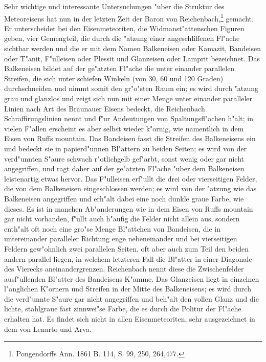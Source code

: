 \documentclass[a4paper, 11pt, oneside, german]{article}
\begin{document}
Sehr wichtige und interessante Untersuchungen "uber die Struktur des Meteoreisens hat nun in der letzten Zeit der Baron von Reichenbach,\footnote{Pongendorffs Ann. 1861 B. 114, S. 99, 250, 264,477.} gemacht. Er unterscheidet bei den Eisenmeteoriten, die Widmanst"attenschen Figuren geben, vier Gemengteil, die durch die "atzung einer angeschliffenen Fl"ache sichtbar werden und die er mit dem Namen Balkeneisen oder Kamazit, Bandeisen oder T"anit, F"ulleisen oder Plessit und Glanzeisen oder Lamprit bezeichnet. Das Balkeneisen bildet auf der ge"atzten Fl"ache die unter einander parallelen Streifen, die sich unter schiefen Winkeln (von 30, 60 und 120 Graden) durchschneiden und nimmt somit den gr"o"sten Raum ein; es wird durch "atzung grau und glanzlos und zeigt sich nun mit einer Menge unter einander paralleler Linien nach Art des Braunauer Eisens bedeckt, die Reichenbach Schraffirungslinien nennt und f"ur Andeutungen von Spaltungsfl"achen h"alt; in vielen F"allen erscheint es aber selbst wieder k"ornig, wie namentlich in dem Eisen von Ruffs mountain. Das Bandeisen fasst die Streifen des Balkeneisens ein und bedeckt sie in papierd"unnen Bl"attern zu beiden Seiten; es wird von der verd"unnten S"aure schwach r"otlichgelb gef"arbt, sonst wenig oder gar nicht angegriffen, und ragt daher auf der ge"atzten Fl"ache "uber dem Balkeneisen leistenartig etwas hervor. Das F"ulleisen erf"ullt die drei oder vierseitigen Felder, die von dem Balkeneisen eingeschlossen werden; es wird von der "atzung wie das Balkeneisen angegriffen und erh"alt dabei eine noch dunkle graue Farbe, wie dieses. Es ist in manchen Ab"anderungen wie in dem Eisen von Ruffs mountain gar nicht vorhanden, f"ullt auch h"aufig die Felder nicht allein aus, sondern enth"alt oft noch eine gro"se Menge Bl"attchen von Bandeisen, die in untereinander paralleler Richtung enge nebeneinander und bei vierseitigen Feldern gew"ohnlich zwei parallelen Seiten, oft aber auch zum Teil den beiden andern parallel liegen, in welchem letzteren Fall die Bl"atter in einer Diagonale des Vierecks aneinandergrenzen. Reichenbach nennt diese die Zwischenfelder ausf"ullenden Bl"atter des Bandeisens K"amme. Das Glanzeisen liegt in einzelnen l"anglichen K"ornern und Streifen in der Mitte des Balkeneisens; es wird durch die verd"unnte S"aure gar nicht angegriffen und beh"alt den vollen Glanz und die lichte, stahlgraue fast zinnwei"se Farbe, die es durch die Politur der Fl"ache erhalten hat. Es findet sich nicht in allen Eisenmeteoriten, sehr ausgezeichnet in dem von Lenarto und Arva.
\end{document}

